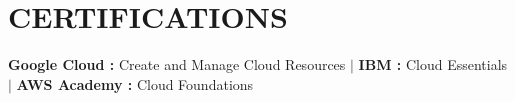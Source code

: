 \documentclass[letterpaper,10pt]{article}
\begin{document}
\section{CERTIFICATIONS}
 \begin{itemize}[leftmargin=0in, label={}]
    \small{\item{
     \textbf{Google Cloud :} Create and Manage Cloud Resources \quad $|$ \quad
     \textbf{IBM :} Cloud Essentials \quad $|$ \quad
     \textbf{AWS Academy :} Cloud Foundations
    }}
 \end{itemize}
\end{document}
